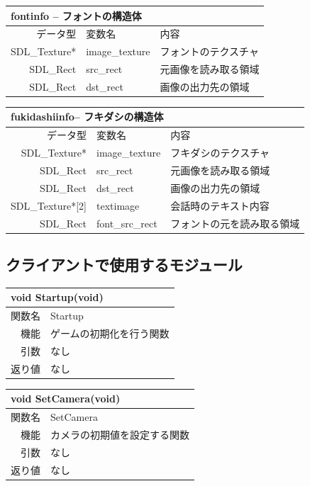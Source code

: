 \documentclass{jarticle}
\begin{document}
\begin{table}[H]
\begin{tabular}{|r|l|l|}
\hline
\multicolumn{3}{|l|}{fontinfo -- フォントの構造体}       \\ \hline
データ型      & 変数名    & 内容        \\ \hline
SDL\_Texture* & image\_texture     & フォントのテクスチャ \\
SDL\_Rect & src\_rect & 元画像を読み取る領域 \\
SDL\_Rect & dst\_rect & 画像の出力先の領域 \\ \hline
\end{tabular}
\end{table}

\begin{table}[H]
\begin{tabular}{|r|l|l|}
\hline
\multicolumn{3}{|l|}{fukidashiinfo-- フキダシの構造体}       \\ \hline
データ型      & 変数名    & 内容        \\ \hline
SDL\_Texture* & image\_texture     & フキダシのテクスチャ \\
SDL\_Rect & src\_rect & 元画像を読み取る領域 \\
SDL\_Rect & dst\_rect & 画像の出力先の領域 \\
SDL\_Texture*[2] & textimage & 会話時のテキスト内容 \\
SDL\_Rect & font\_src\_rect & フォントの元を読み取る領域 \\ \hline
\end{tabular}
\end{table}

\subsection{クライアントで使用するモジュール}
\begin{table}[H]
\begin{tabular}{|r|l|}
\hline
\multicolumn{2}{|l|}{void Startup(void)}       \\ \hline
関数名           & Startup \\ \hline
機能     & ゲームの初期化を行う関数 \\
引数     & なし \\
返り値   & なし \\ \hline
\end{tabular}
\end{table}


\begin{table}[H]
\begin{tabular}{|r|l|}
\hline
\multicolumn{2}{|l|}{void SetCamera(void)}       \\ \hline
関数名           & SetCamera \\ \hline
機能     & カメラの初期値を設定する関数 \\
引数     & なし \\
返り値   & なし \\ \hline
\end{tabular}
\end{table}
\end{document}
